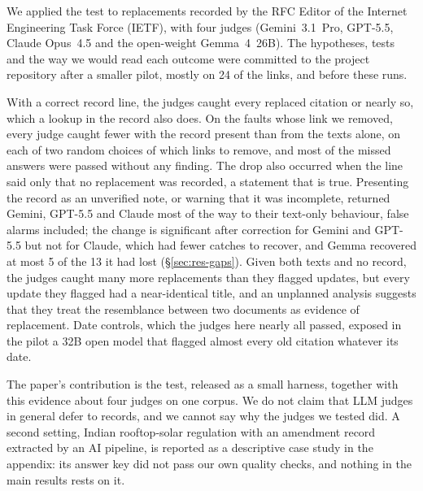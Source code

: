 We applied the test to \ENLinks{} replacements recorded by the RFC Editor of the Internet Engineering Task Force (IETF), with four judges (Gemini~3.1~Pro,
GPT-5.5, Claude Opus~4.5 and the open-weight Gemma~4~26B). The hypotheses, tests and the way we would read each outcome
were committed to the project repository after a smaller pilot, mostly on 24 of the links, and before these runs.

With a correct record line, the judges caught every replaced citation or nearly so, which a lookup in the record
also does. On the faults whose link we removed, every judge caught fewer with the record present than from the texts
alone, on each of two random choices of which links to remove, and most of the missed answers were passed without
any finding. The drop also occurred when the line said only that no replacement was recorded, a statement that is
true. Presenting the record as an unverified note, or warning that it was incomplete, returned Gemini, GPT-5.5 and
Claude most of the way to their text-only behaviour, false alarms included; the change is significant after correction
for Gemini and GPT-5.5 but not for Claude, which had fewer catches to recover, and Gemma recovered at most 5 of the 13
it had lost (\S\ref{sec:res-gaps}). Given both texts and no record, the judges caught many more replacements than they
flagged updates, but every update they flagged had a near-identical title, and an unplanned analysis suggests that
they treat the resemblance between two documents as evidence of replacement.
Date controls, which the judges here nearly all passed, exposed in the pilot a 32B open model that flagged almost every old
citation whatever its date.

The paper's contribution is the test, released as a small harness, together with this evidence about four judges on
one corpus. We do not claim that LLM judges in general defer to records, and we cannot say why the judges we tested
did. A second setting, Indian rooftop-solar regulation with an amendment record extracted by an AI pipeline, is
reported as a descriptive case study in the appendix: its answer key did not pass our own quality checks, and nothing
in the main results rests on it.
